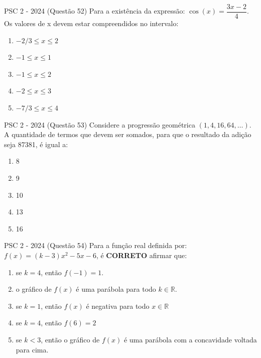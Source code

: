 \documentclass[aspectratio=169]{beamer}
\newif\ifusarcorvermelha
\newcommand{\vermelho}[1]{%
    \ifusarcorvermelha
        {\color{red}#1}%
    \else
        #1%
    \fi
}
\begin{document}
    \begin{frame}{PSC 2 - 2024 (Questão 52)}
       Para a existência da expressão: $\cos(x) = \dfrac{3x-2}{4}$. Os valores de x  devem estar compreendidos no intervalo:


         \begin{enumerate}[a]
                    \item \vermelho{$-{2}/{3} \leq x \leq 2$} %
                    \item $-1 \leq x \leq 1$
                    \item $-1 \leq x \leq 2$
                    \item $-2 \leq x \leq 3$
                    \item $-{7}/{3} \leq x \leq 4$
                \end{enumerate}        
    \end{frame}

    \begin{frame}{PSC 2 - 2024 (Questão 53)}
      Considere a progressão geométrica $(1, 4, 16, 64, … )$. A quantidade de termos que devem ser somados, para que o resultado da adição seja 87381, é igual a:


         \begin{enumerate}[a]
                    \item 8
                    \item \vermelho{9} %
                    \item 10
                    \item 13
                    \item 16
                \end{enumerate}        
    \end{frame}

    \begin{frame}{PSC 2 - 2024 (Questão 54)}
      Para a função real definida por: $f(x)=(k-3)x^{2}-5x-6$, é \textbf{CORRETO} afirmar que:

         \begin{enumerate}[a]
                    \item se $k=4$, então $f(-1)=1.$
                    \item o gráfico de $f(x)$ é uma parábola para todo $k \in \mathbb{R}$.
                    \item \vermelho{se $k=1$, então $f(x)$ é negativa para todo $x \in \mathbb{R}$} %
                    \item se $k = 4$, então $f(6)=2$
                    \item se $k <3$, então o gráfico de $f(x)$ é uma parábola com a concavidade voltada para cima.
                \end{enumerate}        
    \end{frame}
\end{document}
